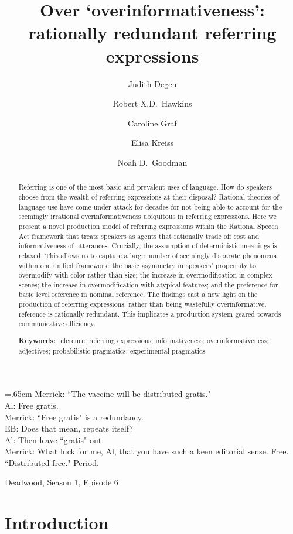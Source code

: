 \documentclass[11pt]{article}
\title{Over `overinformativeness': rationally redundant referring expressions}
\author{Judith Degen \and Robert X.D.~Hawkins \and Caroline Graf \and Elisa Kreiss \and Noah D.~Goodman}
\begin{document}
\maketitle


\begin{abstract}
Referring is one of the most basic and prevalent uses of language. How do speakers choose from the wealth of referring expressions at their disposal? Rational theories of language use have come under attack for decades for not being able to account for the seemingly irrational overinformativeness ubiquitous in referring expressions. Here we present a novel production model of referring expressions within the Rational Speech Act framework that treats speakers as agents that rationally trade off cost and informativeness of utterances. Crucially, the assumption of deterministic meanings is relaxed. This allows us to capture a large number of seemingly disparate phenomena within one unified framework: the basic asymmetry in speakers' propensity to overmodify with color rather than size; the increase in overmodification in complex scenes; the increase in overmodification with atypical features; and the preference for basic level reference in nominal reference. The findings cast a new light on the production of referring expressions: rather than being wastefully overinformative, reference is rationally redundant. This implicates a production system geared towards communicative efficiency.

\textbf{Keywords:} 
reference; referring expressions; informativeness; overinformativeness; adjectives; probabilistic pragmatics; experimental pragmatics
\end{abstract}

\tableofcontents


\epigraph{\hangindent=.65cm Merrick: ``The vaccine will be distributed gratis."\\
Al: Free gratis.\\
Merrick: ``Free gratis" is a redundancy.\\
EB: Does that mean, repeats itself?\\
Al: Then leave ``gratis" out.\\
Merrick: What luck for me, Al, that you have such a keen editorial sense. Free. ``Distributed free." Period.}{Deadwood, Season 1, Episode 6}


\section{Introduction}
\label{sec:intro}
\end{document}
